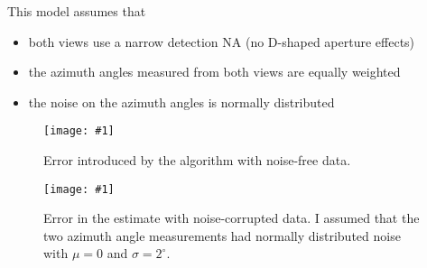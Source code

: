 \documentclass[11pt]{article}
\providecommand{\fig}[4]{
\begin{figure}[h]
 \captionsetup{width=1.0\linewidth}
 \centering
 \texttt{[image: \#1]}
 \caption{#3}
 \label{fig:#4}
\end{figure}
}
\begin{document}
This model assumes that
\begin{itemize}[nosep]
\item both views use a narrow detection NA (no D-shaped aperture effects)
\item the azimuth angles measured from both views are equally weighted
\item the noise on the azimuth angles is normally distributed
\end{itemize}

\fig{../figures/recon-error.pdf}{.9}{Error introduced by the algorithm with
  noise-free data.}{results}

\fig{../figures/recon-error-gauss.pdf}{.9}{Error in the estimate with
  noise-corrupted data. I assumed that the two azimuth angle measurements had normally distributed noise with $\mu = 0$ and $\sigma = 2^{\circ}$.}{results}
\end{document}
